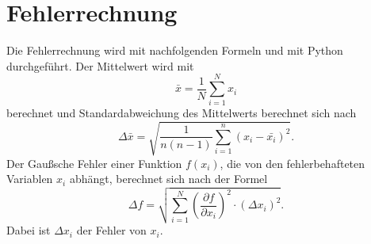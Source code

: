 \section{Fehlerrechnung}
\label{sec:Fehlerrechnung}
Die Fehlerrechnung wird mit nachfolgenden Formeln und mit Python durchgeführt.
Der Mittelwert wird mit
\begin{equation}
  \bar{x}= \frac{1}{N}\sum_{i=1}^N x_i
  \label{eqn:mittelwert}
\end{equation}
berechnet und Standardabweichung des Mittelwerts berechnet sich nach
\begin{equation}
  \Delta\bar{x} = \sqrt{\frac{1}{n(n-1)}\sum_{i=1}^n(x_i-\bar{x_i})^2} .
  \label{eqn:standardabweichung}
\end{equation}
Der Gaußsche Fehler einer Funktion $f(x_i)$, die von den fehlerbehafteten Variablen
$x_i$ abhängt, berechnet sich nach der Formel
\begin{equation}
  \Delta f = \sqrt{\sum_{i=1}^N \left(\frac{\partial f}{\partial x_i}\right)^2
  \cdot (\Delta x_i)^2}.
  \label{eqn:fehlerfortpflanzung}
\end{equation}
Dabei ist $\Delta x_i$ der Fehler von $x_i$.
